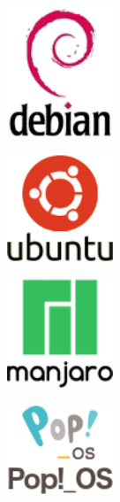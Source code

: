 \documentclass[aspectratio=43]{beamer}
\begin{document}
\begin{frame}{\secname}{\subsecname}
\begin{figure}[b]
\begin{subfigure}{.3\textwidth}
                \centering
                \includegraphics[width=0.35\textwidth]{img/debian.png}
            \end{subfigure}
            \begin{subfigure}{.3\textwidth}
                \centering
                \includegraphics[width=0.35\textwidth]{img/ubuntu.png}
            \end{subfigure}
            \begin{subfigure}{.3\textwidth}
                \centering
                \includegraphics[width=0.35\textwidth]{img/manjaro.png}
            \end{subfigure}
            \centering
            \begin{subfigure}{.3\textwidth}
                \centering
                \includegraphics[width=0.35\textwidth]{img/popos.png}

\end{subfigure}
\end{figure}
\end{frame}
\end{document}
